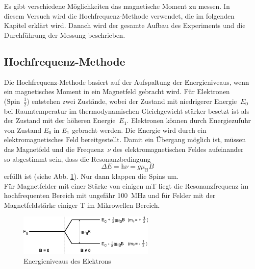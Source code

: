 Es gibt verschiedene Möglichkeiten das magnetische Moment zu messen. In diesem Versuch wird die Hochfrequenz-Methode verwendet, die im folgenden Kapitel erklärt wird. Danach wird der gesamte Aufbau des Experiments und die Durchführung der Messung beschrieben.
\subsection{Hochfrequenz-Methode}
Die Hochfrequenz-Methode basiert auf der Aufspaltung der Energieniveaus, wenn ein magnetisches Moment in ein Magnetfeld gebracht wird. Für Elektronen (Spin~$\frac{1}{2}$) entstehen zwei Zustände, wobei der Zustand mit niedrigerer Energie~$E_0$ bei Raumtemperatur im thermodynamischen Gleichgewicht stärker besetzt ist als der Zustand mit der höheren Energie~$E_1$. Elektronen können durch Energiezufuhr von Zustand $E_0$ in $E_1$ gebracht werden. Die Energie wird durch ein elektromagnetisches Feld bereitgestellt. Damit ein Übergang möglich ist, müssen das Magnetfeld und die Frequenz~$\nu$ des elektromagnetischen Feldes aufeinander so abgestimmt sein, dass die Resonanzbedingung 
\begin{equation}\label{eq:DeltaE}
	\Delta E = \textrm{h} \nu = g \mu_\textrm{B} B
\end{equation}
erfüllt ist (siehe Abb. \ref{fig:elektron}). Nur dann klappen die Spins um. \\
Für Magnetfelder mit einer Stärke von einigen \si{\milli\tesla} liegt die Resonanzfrequenz im hochfrequenten Bereich mit ungefähr \SI{100}{\mega\hertz} und für Felder mit der Magnetfeldstärke einiger \si{\tesla} im Mikrowellen Bereich.
\\
\begin{figure}[h!]
	\centering
	\includegraphics[width=0.6\textwidth]{Anleitung_Abb6.pdf}
	\caption[Energieniveaus]{Energieniveaus des Elektrons \cite{V28}}
	\label{fig:elektron}
\end{figure}


\clearpage
